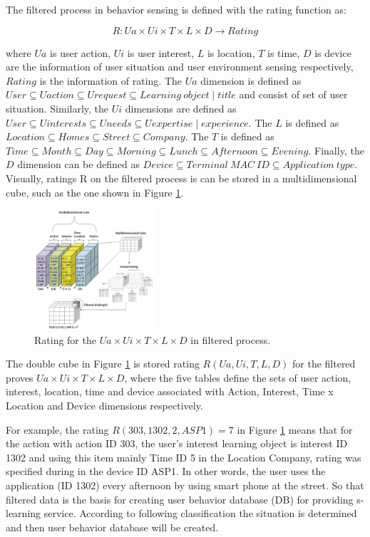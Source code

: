 \documentclass[journal]{vgtc}
\begin{document}
  The filtered process in behavior sensing is defined with the rating function as:

  \begin{equation}
    R: Ua \times Ui \times T \times L \times D \rightarrow Rating
  \end{equation}

  where $Ua$ is user action, $Ui$ is user interest, $L$ is location, $T$ is time, $D$ is device are the information of user situation  and user environment sensing respectively, $Rating$ is the  information of rating. The $Ua$ dimension is defined as $User \subseteq Uaction \subseteq Urequest \subseteq Learning\ object \mid title$ and consist of set of user situation. Similarly, the $Ui$ dimensions are defined as $User \subseteq U interests \subseteq U needs \subseteq U expertise \mid experience$. The $L$ is defined as $Location \subseteq Homes \subseteq Street \subseteq Company$. The $T$ is defined as $Time \subseteq Month \subseteq Day \subseteq Morning \subseteq Lunch \subseteq Afternoon \subseteq Evening$. Finally, the $D$ dimension can be defined as $Device \subseteq Terminal\ MAC\ ID \subseteq Application\ type$. Visually, ratings R on the filtered process is can be stored in a multidimensional cube, such as the one shown in Figure \ref{rating}.

  \begin{figure}[!b]
    \centering
    \includegraphics[width=0.4\textwidth]{rating}
    \caption{Rating for the $Ua \times Ui \times T \times L \times D$ in filtered process\cite{Kim2013}.}
    \label{rating}
  \end{figure}

  The double cube in Figure \ref{rating} is stored rating $R(Ua, Ui, T, L, D)$ for the filtered proves $Ua \times Ui \times T \times L \times D$, where the five tables define the sets of user action, interest, location, time and device associated with Action, Interest, Time x Location and Device dimensions respectively.

  For example, the rating $R(303,1302,2,ASP1)=7$ in Figure \ref{rating} means that for the action with action ID 303, the user's interest learning object is interest ID 1302 and using this item mainly Time ID 5 in the Location Company, rating was specified during in the device ID ASP1. In other words, the user uses the application (ID 1302) every afternoon by using smart phone at the street. So that filtered data is the basis for creating user behavior database (DB) for providing s-learning service. According to following classification the situation is determined and then user behavior database will be created.
\end{document}

